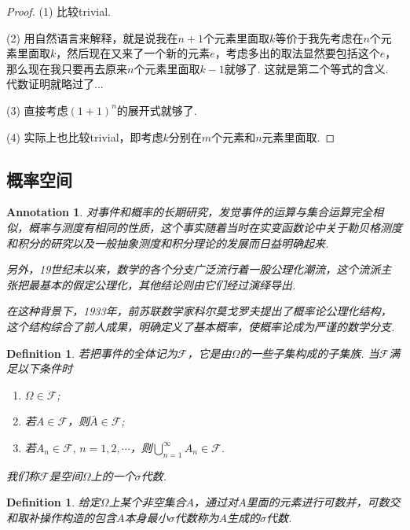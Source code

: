 \documentclass{article}
\newtheorem{definition}[theorem]{Definition}
\newtheorem{annotation}[theorem]{Annotation}
\begin{document}
\begin{proof}
(1) 比较trivial.

(2) 用自然语言来解释，就是说我在$n+1$个元素里面取$k$等价于我先考虑在$n$个元素里面取$k$，然后现在又来了一个新的元素$e$，考虑多出的取法显然要包括这个$e$，那么现在我只要再去原来$n$个元素里面取$k-1$就够了. 这就是第二个等式的含义. 代数证明就略过了...

(3) 直接考虑$(1+1)^n$的展开式就够了.

(4) 实际上也比较trivial，即考虑$k$分别在$m$个元素和$n$元素里面取.
\end{proof}

\newpage
\subsection{概率空间}

\begin{annotation}
\rm 对事件和概率的长期研究，发觉事件的运算与集合运算完全相似，概率与测度有相同的性质，这个事实随着当时在实变函数论中关于勒贝格测度和积分的研究以及一般抽象测度和积分理论的发展而日益明确起来. 

另外，19世纪末以来，数学的各个分支广泛流行着一股公理化潮流，这个流派主张把最基本的假定公理化，其他结论则由它们经过演绎导出.

在这种背景下，1933年，前苏联数学家科尔莫戈罗夫提出了概率论公理化结构，这个结构综合了前人成果，明确定义了基本概率，使概率论成为严谨的数学分支.
\end{annotation}

\begin{definition}
\rm 若把事件的全体记为$\mathscr{F}$，它是由$\Omega$的一些子集构成的子集族. 当$\mathscr{F}$满足以下条件时
\begin{enumerate}
	\item $\Omega \in \mathscr{F}$;
	\item 若$A \in \mathscr{F}$，则$\bar{A} \in \mathscr{F}$;
	\item 若$A_n \in \mathscr{F}, \, n=1,2,\cdots$，则$\bigcup\limits_{n=1}^{\infty} A_n \in \mathscr{F}$.
\end{enumerate}
我们称$\mathscr{F}$是空间$\Omega$上的一个{\color{red}$\sigma$代数}. 
\end{definition}

\begin{definition}
\rm 给定$\Omega$上某个非空集合$A$，通过对$A$里面的元素进行可数并，可数交和取补操作构造的包含$A$本身最小$\sigma$代数称为$A${\color{red}生成}的$\sigma$代数.
\end{definition}
\end{document}
